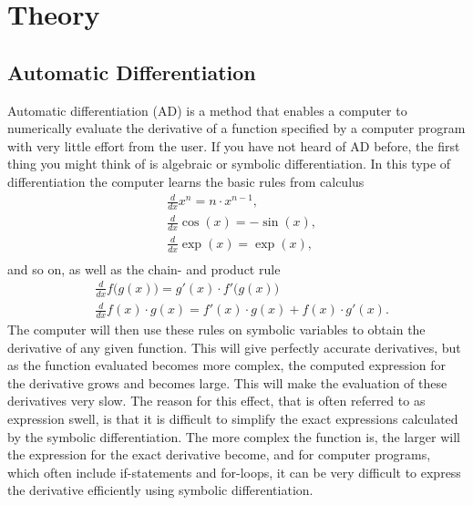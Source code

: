 \chapter{Theory}
\label{ch:theory}
\section{Automatic Differentiation}
\label{sec:AD}
Automatic differentiation (AD) is a method that enables a computer to numerically evaluate the derivative of a function specified by a computer program with very little effort from the user. If you have not heard of AD before, the first thing you might think of is algebraic or symbolic differentiation. In this type of differentiation the computer learns the basic rules from calculus
\begin{align*}
    &\frac{d}{dx}x^n     = n\cdot x^{n-1}, \\
    &\frac{d}{dx}\cos(x)  = -\sin(x), \\
    &\frac{d}{dx}\exp(x) = \exp(x), \\
\end{align*}
and so on, as well as the chain- and product rule
\begin{align*}
    &\frac{d}{dx}f\bigl(g(x)\bigr) = g'(x)\cdot f'\bigl(g(x)\bigr)\\
    &\frac{d}{dx}f(x)\cdot g(x) = f'(x)\cdot g(x) + f(x)\cdot g'(x).
\end{align*}
The computer will then use these rules on symbolic variables to obtain the derivative of any given function. This will give perfectly accurate derivatives, but as the function evaluated becomes more complex, the computed expression for the derivative grows and becomes large. This will make the evaluation of these derivatives very slow. The reason for this effect, that is often referred to as expression swell, is that it is difficult to simplify the exact expressions calculated by the symbolic differentiation. The more complex the function is, the larger will the expression for the exact derivative become, and for computer programs, which often include if-statements and for-loops, it can be very difficult to express the derivative efficiently using symbolic differentiation. 

